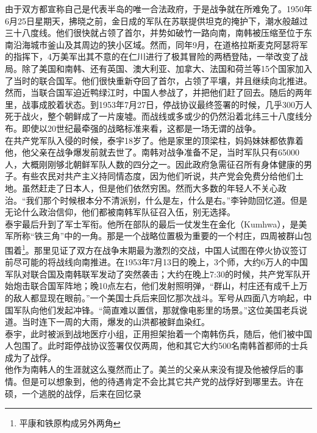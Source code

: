 由于双方都宣称自己是代表半岛的唯一合法政府，于是战争就在所难免了。1950年6月25日星期天，拂晓之前，金日成的军队在苏联提供坦克的掩护下，潮水般越过三十八度线。他们很快就占领了首尔，并势如破竹一路向南，南韩被压缩至位于东南沿海城市釜山及其周边的狭小区域。然而，同年9月，在道格拉斯麦克阿瑟将军的指挥下，4万美军出其不意的在仁川进行了极其冒险的两栖登陆，一举改变了战局。除了美国和南韩、还有英国、澳大利亚、加拿大、法国和荷兰等15个国家加入了当时的联合国军。他们很快重新夺回了首尔，占领了平壤，并且继续向北推进。然而，当联合国军迫近鸭绿江时，中国人参战了，并把他们赶了回去。随后的两年里，战事成胶着状态。到1953年7月27日，停战协议最终签署的时候，几乎300万人死于战火，整个朝鲜成了一片废墟。而战线或多或少的仍然沿着北纬三十八度线分布。即使以20世纪最牵强的战略标准来看，这都是一场无谓的战争。\\

在共产党军队入侵的时候，泰宇18岁了。他是家里的顶梁柱，妈妈妹妹都依靠着他，他父亲在战争爆发前就去世了。南韩对战争准备不足，当时军队只有65000人，大概刚刚够北朝鲜军队人数的四分之一。因此政府急需征召所有身体健康的男子。有些农民对共产主义持同情态度，因为他们听说，共产党会免费分给他们土地。虽然赶走了日本人，但是他们依然穷困。然而大多数的年轻人不关心政治。“我们那个时候根本分不清派别，什么是左，什么是右。”李钟勋回忆道。但是无论什么政治信仰，他们都被南韩军队征召入伍，别无选择。\\

泰宇最后升到了军士军衔。他所在部队的最后一仗发生在金化（Kumhwa），是美军所称“铁三角”中的一角。那是一个战略位置极为重要的一个村庄，四周被群山包围着\footnote{平康和铁原构成另外两角}。那里见证了双方在战争末期最为激烈的交战，中国人试图在停火协议签订前尽可能的将战线向南推进。在1953年7月13日的晚上，3个师，大约6万人的中国军队对联合国及南韩联军发动了突然袭击；大约在晚上7:30的时候，共产党军队开始炮击联合国军阵地；晚10点左右，他们发射照明弹，“群山，村庄还有成千上万的敌人都显现在眼前。”一个美国士兵后来回忆那次战斗。军号从四面八方响起，中国军队向他们发起冲锋。“简直难以置信，那就像电影里的场景。”这位美国老兵说道。当时连下一周的大雨，爆发的山洪都被鲜血染红。\\

泰宇，此时被派到战地医疗小组，正用担架抬着一个南韩伤兵，随后，他们被中国人包围了。此时距停战协议签署仅仅两周，他和其它大约500名南韩首都师的士兵成为了战俘。\\

他作为南韩人的生涯就这么戛然而止了。美兰的父亲从来没有提及他被俘后的事情。但是可以想象到，他的待遇肯定不会比其它共产党的战俘好到哪里去。许在硕，一个逃脱的战俘，后来在回忆录\\

